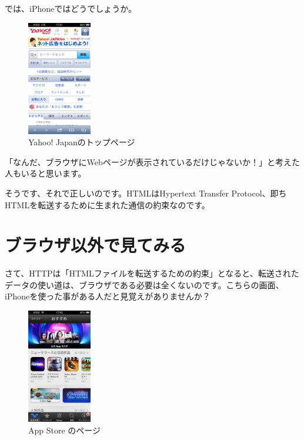 \documentclass[a4j,11pt,openany]{jsbook}
\begin{document}
では、iPhoneではどうでしょうか。

\begin{figure}[H]
    \begin{center}
        \includegraphics[height=5cm]{./yahoo_sp.png}
        \caption{Yahoo! Japanのトップページ}
        \label{yahoo_sp}
    \end{center}
\end{figure}

「なんだ、ブラウザにWebページが表示されているだけじゃないか！」と考えた人もいると思います。

そうです、それで正しいのです。HTMLはHypertext Transfer Protocol、即ちHTMLを転送するために生まれた通信の約束なのです。

\section{ブラウザ以外で見てみる}

さて、HTTPは「HTMLファイルを転送するための約束」となると、転送されたデータの使い道は、ブラウザである必要は全くないのです。こちらの画面、iPhoneを使った事がある人だと見覚えがありませんか？

\begin{figure}[H]
    \begin{center}
        \includegraphics[height=5cm]{./app_store.png}
        \caption{App Store のページ}
        \label{yahoo_sp}
    \end{center}
\end{figure}
\end{document}
